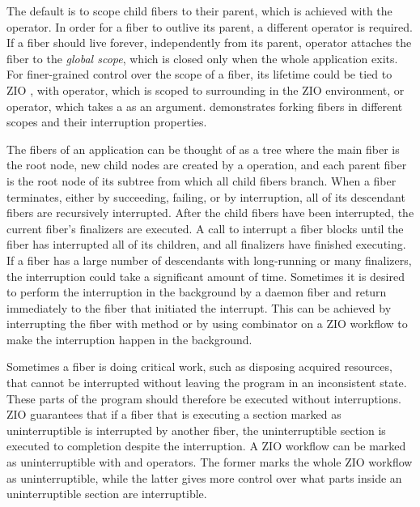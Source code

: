 

The default is to scope child fibers to their parent, which is achieved with the  operator. In order for a fiber to outlive its parent, a different operator is required. If a fiber should live forever, independently from its parent,  operator attaches the fiber to the \emph{global scope}, which is closed only when the whole application exits. For finer-grained control over the scope of a fiber, its lifetime could be tied to ZIO , with  operator, which is scoped to surrounding  in the ZIO environment, or  operator, which takes a  as an argument.  demonstrates forking fibers in different scopes and their interruption properties.



The fibers of an application can be thought of as a tree where the main fiber is the root node, new child nodes are created by a  operation, and each parent fiber is the root node of its subtree from which all child fibers branch. When a fiber terminates, either by succeeding, failing, or by interruption, all of its descendant fibers are recursively interrupted. After the child fibers have been interrupted, the current fiber's finalizers are executed. A call to interrupt a fiber blocks until the fiber has interrupted all of its children, and all finalizers have finished executing. If a fiber has a large number of descendants with long-running or many finalizers, the interruption could take a significant amount of time. Sometimes it is desired to perform the interruption in the background by a daemon fiber and return immediately to the fiber that initiated the interrupt. This can be achieved by interrupting the fiber with  method or by using  combinator on a ZIO workflow to make the interruption happen in the background.

Sometimes a fiber is doing critical work, such as disposing acquired resources, that cannot be interrupted without leaving the program in an inconsistent state. These parts of the program should therefore be executed without interruptions. ZIO guarantees that if a fiber that is executing a section marked as uninterruptible is interrupted by another fiber, the uninterruptible section is executed to completion despite the interruption. A ZIO workflow can be marked as uninterruptible with  and  operators. The former marks the whole ZIO workflow as uninterruptible, while the latter gives more control over what parts inside an uninterruptible section are interruptible.

